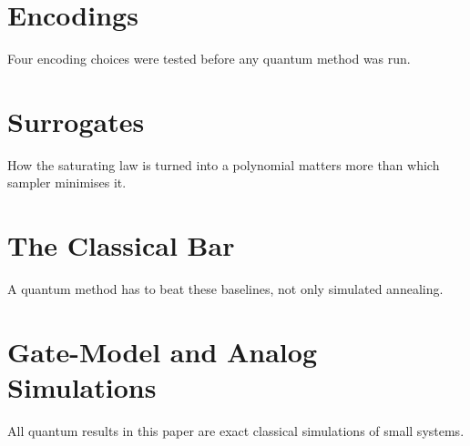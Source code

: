\documentclass[runningheads]{llncs}
\begin{document}
\begin{table}[t]
\centering\caption{Legacy audit findings (from \texttt{docs/AUDIT.md}).}\label{tab:audit}
\scriptsize
\end{table}

\section{Encodings}\label{sec:enc}
Four encoding choices were tested before any quantum method was run.


\begin{table}[t]
\centering\caption{E1: penalty-\QUBO{} ground state versus MILP optimum on 11 exhaustively enumerated instances.}\label{tab:e1}
\resizebox{\textwidth}{!}{}
\end{table}

\section{Surrogates}\label{sec:sur}
How the saturating law is turned into a polynomial matters more than which sampler minimises it.


\begin{table}[t]
\centering\caption{E2: share of the achievable cooling lost by each surrogate's optimum, scored on the exact law.}\label{tab:e2}
\small
\end{table}

\section{The Classical Bar}\label{sec:classical}
A quantum method has to beat these baselines, not only simulated annealing.


\begin{table}[t]
\centering\caption{E3: median raw success per read on safe-penalty \QUBO{}s.}\label{tab:e3}
\resizebox{\textwidth}{!}{}
\end{table}

\section{Gate-Model and Analog Simulations}\label{sec:quantum}
All quantum results in this paper are exact classical simulations of small systems.

\end{document}
